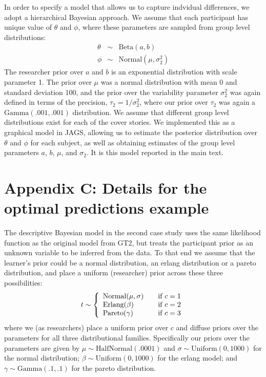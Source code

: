 \documentclass[doc,floatsintext]{apa6}
\begin{document}
In order to specify a model that allows us to capture indvidual differences, we adopt a hierarchical Bayesian approach. We assume that each participant has unique value of $\theta$ and $\phi$, where these parameters are sampled from group level distributions:
\begin{equation}
\begin{array}{rcl}
\theta & \sim & \mbox{Beta}(a,b) \\
\phi & \sim & \mbox{Normal}(\mu,\sigma_2^2)
\end{array}
\end{equation}
The researcher prior over $a$ and $b$ is an exponential distribution with scale parameter 1. The prior over $\mu$ was a normal distribution with mean 0 and standard deviation 100, and the prior over the variability parameter $\sigma_2^2$ was again defined in terms of the precision, $\tau_2 = 1/\sigma_2^2$, where our prior over $\tau_2$ was again a $\mbox{Gamma}(.001,.001)$ distribution. We assume that different group level distributions exist for each of the cover stories. We implemented this as a graphical model in JAGS, allowing us to estimate the posterior distribution over $\theta$ and $\phi$ for each subject, as well as obtaining estimates of the group level parameters $a$, $b$, $\mu$, and $\sigma_2$. It is this model reported in the main text.

\section*{Appendix C: Details for the optimal predictions example}

The descriptive Bayesian model in the second case study uses the same likelihood function as the original model from GT2, but treats the participant prior as an unknown variable to be inferred from the data. To that end we assume that the learner's prior could be a normal distribution, an erlang distribution or a pareto distribution, and place a uniform (researcher) prior across these three possibilities:
\begin{equation}
t \sim \left\{
  \begin{array}{l l}
    \mbox{Normal}( \mu , \sigma ) & \quad \text{if $c=1$}\\
    \mbox{Erlang}( \beta ) & \quad \text{if $c=2$}\\
    \mbox{Pareto}( \gamma) & \quad \text{if $c=3$}
  \end{array} \right.
\end{equation}
where we (as researchers) place a uniform prior over $c$ and diffuse priors over the parameters for all three distributional families. Specifically our priors over the parameters are given by $\mu \sim \mbox{HalfNormal}(.0001)$ and $\sigma \sim \mbox{Uniform}(0,1000)$ for the normal distribution; $\beta \sim  \mbox{Uniform}(0,1000)$ for the erlang model; and $\gamma \sim \mbox{Gamma}(.1,.1)$ for the pareto distribution.
\end{document}
